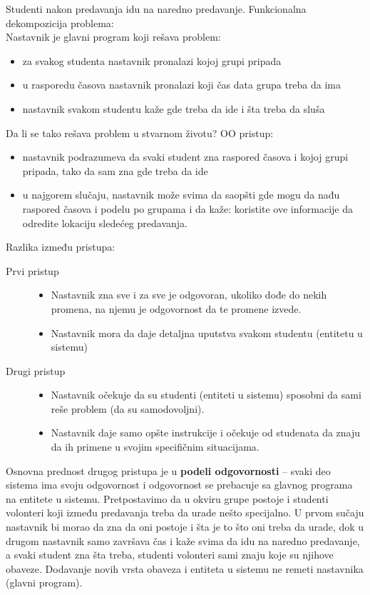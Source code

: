 \documentclass[../main.tex]{subfiles}
\begin{document}
\begin{boxprimer}[breakable]
Studenti nakon predavanja idu na naredno predavanje. Funkcionalna dekompozicija problema:\\
Nastavnik je glavni program koji rešava problem:
\begin{itemize}
\item za svakog studenta nastavnik pronalazi kojoj grupi pripada
\item u rasporedu časova nastavnik pronalazi koji čas data grupa treba da ima
\item nastavnik svakom studentu kaže gde treba da ide i šta treba da sluša
\end{itemize}
Da li se tako rešava problem u stvarnom životu?
OO pristup:
\begin{itemize}
\item nastavnik podrazumeva da svaki student zna raspored časova i kojoj grupi pripada, tako da sam zna gde treba da ide
\item u najgorem slučaju, nastavnik može svima da saopšti gde mogu da nađu raspored časova i podelu po grupama i da kaže: koristite ove informacije da odredite lokaciju sledećeg predavanja.
\end{itemize}
Razlika između pristupa:
\begin{description}
\item[Prvi pristup] \hfill
	\begin{itemize}
	\item Nastavnik zna sve i za sve je odgovoran, ukoliko dođe do nekih promena, na njemu je odgovornost da te promene izvede.
	\item Nastavnik mora da daje detaljna uputstva svakom studentu (entitetu u sistemu)
	\end{itemize}
\item[Drugi pristup] \hfill
	\begin{itemize}
	\item  Nastavnik očekuje da su studenti (entiteti u sistemu) sposobni da sami reše problem (da su samodovoljni).
	\item Nastavnik daje samo opšte instrukcije i očekuje od studenata da znaju da ih primene u svojim specifičnim situacijama.
	\end{itemize}
\end{description}

Osnovna prednost drugog pristupa je u {\bf podeli odgovornosti} -- svaki deo sistema ima svoju odgovornost i odgovornost se prebacuje sa glavnog programa na entitete u sistemu.
Pretpostavimo da u okviru grupe postoje i studenti volonteri koji između predavanja treba da urade nešto specijalno. U prvom sučaju nastavnik bi morao da zna da oni postoje i šta je to što oni treba da urade, dok u drugom nastavnik samo završava čas i kaže svima da idu na naredno predavanje, a svaki student zna šta treba, studenti volonteri sami znaju koje su njihove obaveze. Dodavanje novih vrsta obaveza i entiteta u sistemu ne remeti nastavnika (glavni program).

\end{boxprimer}
\end{document}
